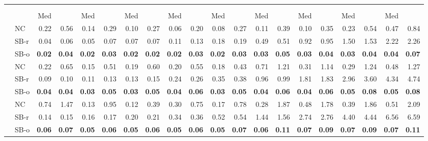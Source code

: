 \documentclass[runningheads,a4paper]{llncs}
\begin{document}
\begin{sidewaystable}
\scriptsize
\centering
\begin{tabularx}{1\textwidth}{p{0.8cm}p{0.8cm}|RR|RR|RR|RR|RR|RR|RR|RR|RR}
& &  \\
  & &  &  &  &  &  &  &  &  &  \\
\centering  & & Med &  & Med &  & Med &  & Med &  & Med &  & Med &  & Med &  & Med &  & Med &  \\
\hline
\centering{} & \centering NC & 0.22 & 0.56 & 0.14 & 0.29 & 0.10 & 0.27 & 0.06 & 0.20 & 0.08 & 0.27 & 0.11 & 0.39 & 0.10 & 0.35 & 0.23 & 0.54 & 0.47 & 0.84 \\
 & \centering SB-r  & 0.04 & 0.06 & 0.05 & 0.07 & 0.07 & 0.07 & 0.11 & 0.13 & 0.18 & 0.19 & 0.49 & 0.51 & 0.92 & 0.95 & 1.50 & 1.53 & 2.22 & 2.26 \\
 & \centering SB-o  & \textbf{0.02} & \textbf{0.04} & \textbf{0.02} & \textbf{0.03} & \textbf{0.02} & \textbf{0.02} & \textbf{0.02} & \textbf{0.03} & \textbf{0.02} & \textbf{0.03} & \textbf{0.03} & \textbf{0.05} & \textbf{0.03} & \textbf{0.04} & \textbf{0.03} & \textbf{0.04} & \textbf{0.04} & \textbf{0.07} \\
\hline
\centering{} & \centering NC & 0.22 & 0.65 & 0.15 & 0.51 & 0.19 & 0.60 & 0.20 & 0.55 & 0.18 & 0.43 & 0.71 & 1.21 & 0.31 & 1.14 & 0.29 & 1.24 & 0.48 & 1.27 \\
 & \centering SB-r  & 0.09 & 0.10 & 0.11 & 0.13 & 0.13 & 0.15 & 0.24 & 0.26 & 0.35 & 0.38 & 0.96 & 0.99 & 1.81 & 1.83 & 2.96 & 3.60 & 4.34 & 4.74 \\
 & \centering SB-o  & \textbf{0.04} & \textbf{0.04} & \textbf{0.03} & \textbf{0.05} & \textbf{0.03} & \textbf{0.05} & \textbf{0.04} & \textbf{0.06} & \textbf{0.03} & \textbf{0.05} & \textbf{0.04} & \textbf{0.06} & \textbf{0.04} & \textbf{0.06} & \textbf{0.05} & \textbf{0.08} & \textbf{0.05} & \textbf{0.08} \\
\hline
\centering{} & \centering NC & 0.74 & 1.47 & 0.13 & 0.95 & 0.12 & 0.39 & 0.30 & 0.75 & 0.17 & 0.78 & 0.28 & 1.87 & 0.48 & 1.78 & 0.39 & 1.86 & 0.51 & 2.09 \\
 & \centering SB-r  & 0.14 & 0.15 & 0.16 & 0.17 & 0.20 & 0.21 & 0.34 & 0.36 & 0.52 & 0.54 & 1.44 & 1.56 & 2.74 & 2.76 & 4.40 & 4.44 & 6.56 & 6.59 \\
 & \centering SB-o  & \textbf{0.06} & \textbf{0.07} & \textbf{0.05} & \textbf{0.06} & \textbf{0.05} & \textbf{0.06} & \textbf{0.05} & \textbf{0.06} & \textbf{0.05} & \textbf{0.07} & \textbf{0.06} & \textbf{0.11} & \textbf{0.07} & \textbf{0.09} & \textbf{0.07} & \textbf{0.09} & \textbf{0.07} & \textbf{0.11} \\

\end{tabularx}
\end{sidewaystable}
\end{document}
